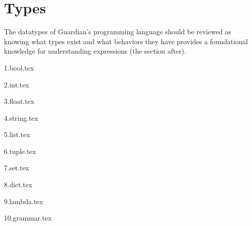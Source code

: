 
\section{Types}
{
	The datatypes of Guardian's programming language
	should be reviewed
	as knowing what types exist
	and what behaviors they have provides a foundational knowledge for
	understanding expressions (the section after).
	
	{1.bool.tex}
	
	{2.int.tex}
	
	{3.float.tex}
	
	{4.string.tex}
	
	{5.list.tex}
	
	{6.tuple.tex}
	
	{7.set.tex}
	
	{8.dict.tex}
	
	{9.lambda.tex}
	
	{10.grammar.tex}
}

